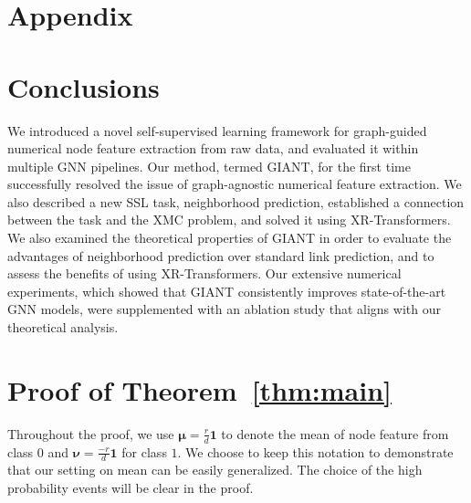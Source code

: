 \documentclass{article} %
\newtheorem{theorem}{Theorem}[section]
\begin{document}




\clearpage
\appendix
\section*{Appendix}
\section{Conclusions}
We introduced a novel self-supervised learning framework for graph-guided numerical node feature extraction from raw data, and evaluated it within multiple GNN pipelines. Our method, termed GIANT, for the first time successfully resolved the issue of graph-agnostic numerical feature extraction. We also described a new SSL task, neighborhood prediction, established a connection between the task and the XMC problem, and solved it using XR-Transformers. We also examined the theoretical properties of GIANT in order to evaluate the advantages of neighborhood prediction over standard link prediction, and to assess the benefits of using XR-Transformers. Our extensive numerical experiments, which showed that GIANT consistently improves state-of-the-art GNN models, were supplemented with an ablation study that aligns with our theoretical analysis.

\section{Proof of Theorem~\ref{thm:main}}

Throughout the proof, we use $\boldsymbol{\mu} = \frac{r}{d}\mathbf{1}$ to denote the mean of node feature from class $0$ and $\boldsymbol{\nu} = \frac{-r}{d}\mathbf{1}$ for class $1$. We choose to keep this notation to demonstrate that our setting on mean can be easily generalized. The choice of the high probability events will be clear in the proof.
\end{document}
